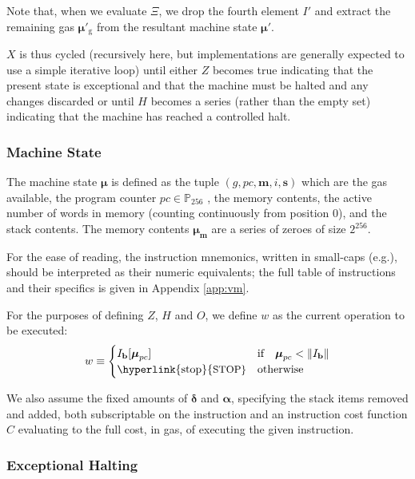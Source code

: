 \documentclass[9pt,oneside]{amsart}
\makeatletter
\newcommand{\linkdest}[1]{\Hy@raisedlink{\hypertarget{#1}{}}}
\newcommand*\eg{e.g.\@\xspace}
\makeatother
\begin{document}
\begin{multicols}{2}
Note that, when we evaluate $\Xi$, we drop the fourth element $I'$ and extract the remaining gas $\boldsymbol{\mu}'_{\mathrm{g}}$ from the resultant machine state $\boldsymbol{\mu}'$.

$X$ is thus cycled (recursively here, but implementations are generally expected to use a simple iterative loop) until either \hyperlink{zhalt}{$Z$} becomes true indicating that the present state is exceptional and that the machine must be halted and any changes discarded or until \hyperlink{hhalt}{$H$} becomes a series (rather than the empty set) indicating that the machine has reached a controlled halt.

\subsubsection{Machine State}
The machine state $\boldsymbol{\mu}$ is defined as the tuple $(g, pc, \mathbf{m}, i, \mathbf{s})$ which are the gas available, the program counter $pc \in \mathbb{P}_{256}$ , the memory contents, the active number of words in memory (counting continuously from position 0), and the stack contents. The memory contents $\boldsymbol{\mu}_{\mathbf{m}}$ are a series of zeroes of size $2^{256}$.

For the ease of reading, the instruction mnemonics, written in small-caps (\eg {}), should be interpreted as their numeric equivalents; the full table of instructions and their specifics is given in Appendix \ref{app:vm}.

For the purposes of defining $Z$, $H$ and $O$, we define $w$ as the current operation to be executed:
\begin{equation}\label{eq:currentoperation}
w \equiv \begin{cases} I_{\mathbf{b}}[\boldsymbol{\mu}_{pc}] & \text{if} \quad \boldsymbol{\mu}_{pc} < \lVert I_{\mathbf{b}} \rVert \\
\text{\hyperlink{stop}{\small STOP}} & \text{otherwise}
\end{cases}
\end{equation}

We also assume the fixed amounts of $\mathbf{\delta}$ and $\mathbf{\alpha}$, specifying the stack items removed and added, both subscriptable on the instruction and an instruction cost function $C$ evaluating to the full cost, in gas, of executing the given instruction.

\subsubsection{Exceptional Halting}\hypertarget{Exceptional_Halting_function_Z}{}\linkdest{zhalt}


\end{multicols}
\end{document}
